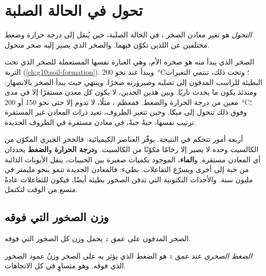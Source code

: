 \section{تحول في الحالة الصلبة}

\begin{definition}[التحول]\label{def:g12:metamorphic-rocks:metamorphism}
\emph{التحول} هو تغير
معادن الصخر ، في الحالة الصلبة، حين يُنقل
إلى درجة حرارة وضغط مختلفين عن اللذين تكوّن فيهما.
والصخر الذي يصير إليه صخر متحول.
\end{definition}

الصخر الذي يبدأ منه  هو صخره الأم، وهي العبارة نفسها
المستعملة للصخر الذي تحت التربة (\cref{ch:g10:soil-formation}). ويبدأ  عند نحو \qty{200}{\celsius}؛ وتحت ذلك، تنتمي التغيرات
البطيئة للراسب المدفون إلى تصلبه وصيرورته صخرًا. وينتهي
حيث يبدأ الصخر بالانصهار: ومنذئذ يكون ما يحدث ناريًا. وبين
هذين الحدين، لا يكون كل معدن مستقرًا إلا في مدى معين من
درجة الحرارة والضغط. فمعظم ، مثلًا، لا تدوم إلا حتى
نحو 150 أو \qty{200}{\celsius}؛ وفوق ذلك تتحول إلى ميكا. وحين
تتغير الظروف، تعيد ذرات المعادن غير المستقرة ترتيب نفسها،
حبةً حبةً، في معادن مستقرة في الظروف الجديدة.

أربعة أمور تتحكم في النتيجة. \textbf{} يوفّر
العناصر الكيميائية: فالحجر الجيري المكوّن من الكالسيت وحده لا يصير إلا
رخامًا مكوّنًا من الكالسيت. و\textbf{درجة الحرارة} و\textbf{الضغط} يحددان أي
المعادن مستقرة. و\textbf{الماء}، الموجود بكميات صغيرة بين
الحبيبات، ينقل الأيونات الذائبة من حبة إلى أخرى ويسرّع
التفاعلات.  بطيء: فالمعادن الجديدة تنمو بنحو مليمتر
في مليون سنة. والأحداث التكتونية التي تدفن الصخور بطيئة أيضًا، فيكون
للتفاعلات عادةً متسع من الوقت لتكتمل.

\subsection{وزن الصخور التي فوقه}

الصخر المدفون على عمق $z$ يحمل وزن كل الصخور التي فوقه.

\begin{definition}\label{def:g12:metamorphic-rocks:lithostatic}
\emph{الضغط الصخري} عند عمق $z$
هو الضغط الذي يؤثر به على الصخر وزنُ عمود الصخور الذي
فوقه. وهو متساوٍ في كل الاتجاهات.
\end{definition}

